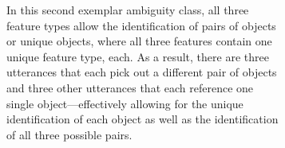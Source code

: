 \documentclass[11pt,a4paper]{article}
\begin{document}
\begin{figure}[!htb]
\begin{subfigure}{\linewidth}
\begin{subfigure}[t]{0.3\linewidth}
		\end{subfigure}
		\hspace*{0.3cm}
		\begin{subfigure}[t]{0.3\linewidth}
		\end{subfigure}
		\caption{In this second exemplar ambiguity class, all three feature types allow the identification of pairs of objects or unique objects, where all three features contain one unique feature type, each. As a result, there are three utterances that each pick out a different pair of objects and three other utterances that each reference one single object---effectively allowing for the unique identification of each object as well as the identification of all three possible pairs.}
	\end{subfigure}
	\begin{subfigure}{\linewidth}
		\centering
		\begin{subfigure}[b]{0.3\linewidth}
			\centering
\end{subfigure}
\end{subfigure}
\end{figure}
\end{document}
